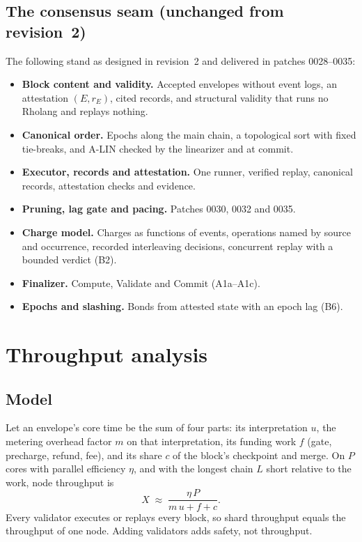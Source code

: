 \documentclass[11pt]{article}
\begin{document}
\subsection{The consensus seam (unchanged from revision~2)}

The following stand as designed in revision~2 and delivered in patches 0028--0035:
\begin{itemize}
\item \textbf{Block content and validity.} Accepted envelopes without event logs, an attestation $(E, r_E)$, cited records, and structural validity that runs no Rholang and replays nothing.
\item \textbf{Canonical order.} Epochs along the main chain, a topological sort with fixed tie-breaks, and A-LIN checked by the linearizer and at commit.
\item \textbf{Executor, records and attestation.} One runner, verified replay, canonical records, attestation checks and evidence.
\item \textbf{Pruning, lag gate and pacing.} Patches 0030, 0032 and 0035.
\item \textbf{Charge model.} Charges as functions of events, operations named by source and occurrence, recorded interleaving decisions, concurrent replay with a bounded verdict (B2).
\item \textbf{Finalizer.} Compute, Validate and Commit (A1a--A1c).
\item \textbf{Epochs and slashing.} Bonds from attested state with an epoch lag (B6).
\end{itemize}

\section{Throughput analysis}\label{sec:throughput}

\subsection{Model}

Let an envelope's core time be the sum of four parts: its interpretation $u$, the metering overhead factor $m$ on that interpretation, its funding work $f$ (gate, precharge, refund, fee), and its share $c$ of the block's checkpoint and merge. On $P$ cores with parallel efficiency $\eta$, and with the longest chain $L$ short relative to the work, node throughput is
\[
X \;\approx\; \frac{\eta\,P}{m\,u + f + c}.
\]
Every validator executes or replays every block, so shard throughput equals the throughput of one node. Adding validators adds safety, not throughput.
\end{document}
